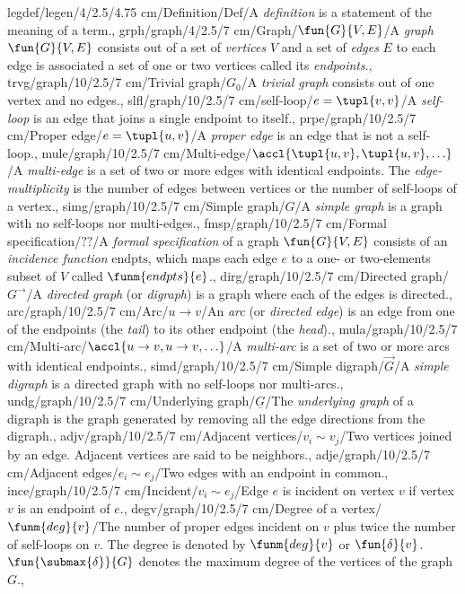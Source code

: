 legdef/legen/4/2.5/4.75 cm/Definition/Def/{A \emph{definition} is a statement of the meaning of a term.},
grph/graph/4/2.5/7 cm/Graph/{$\fun{G}{V,E}$}/{A \emph{graph} $\fun{G}{V,E}$ consists out of a set of \emph{vertices} $V$ and a set of \emph{edges} $E$ to each edge is associated a set of one or two vertices called its \emph{endpoints}.},
trvg/graph/10/2.5/7 cm/{Trivial graph}/$G_0$/{A \emph{trivial graph} consists out of one vertex and no edges.},
slfl/graph/10/2.5/7 cm/{self-loop}/$e=\tupl{v,v}$/{A \emph{self-loop} is an edge that joins a single endpoint to itself.},
prpe/graph/10/2.5/7 cm/{Proper edge}/$e=\tupl{u,v}$/{A \emph{proper edge} is an edge that is not a self-loop.},
mule/graph/10/2.5/7 cm/{Multi-edge}/$\accl{\tupl{u,v},\tupl{u,v},\ldots}$/{A \emph{multi-edge} is a set of two or more edges with identical endpoints. The \emph{edge-multiplicity} is the number of edges between vertices or the number of self-loops of a vertex.},
simg/graph/10/2.5/7 cm/{Simple graph}/$G$/{A \emph{simple graph} is a graph with no self-loops nor multi-edges.},
fmsp/graph/10/2.5/7 cm/{Formal specification}/$??$/{A \emph{formal specification} of a graph $\fun{G}{V,E}$ consists of an \emph{incidence function} $\mbox{endpts}$, which maps each edge $e$ to a one- or two-elements subset of $V$ called $\funm{endpts}{e}$.},
dirg/graph/10/2.5/7 cm/{Directed graph}/$G^{\rightarrow}$/{A \emph{directed graph} (or \emph{digraph}) is a graph where each of the edges is directed.},
arc/graph/10/2.5/7 cm/{Arc}/$u\rightarrow v$/{An \emph{arc} (or \emph{directed edge}) is an edge from one of the endpoints (the \emph{tail}) to its other endpoint (the \emph{head}).},
mula/graph/10/2.5/7 cm/{Multi-arc}/$\accl{u\rightarrow v,u\rightarrow v,\ldots}$/{A \emph{multi-arc} is a set of two or more arcs with identical endpoints.},
simd/graph/10/2.5/7 cm/{Simple digraph}/$\vec{G}$/{A \emph{simple digraph} is a directed graph with no self-loops nor multi-arcs.},
undg/graph/10/2.5/7 cm/{Underlying graph}/$\underline{G}$/{The \emph{underlying graph} of a digraph is the graph generated by removing all the edge directions from the digraph.},
adjv/graph/10/2.5/7 cm/{Adjacent vertices}/{$v_i\sim v_j$}/{Two vertices joined by an edge. Adjacent vertices are said to be neighbors.},
adje/graph/10/2.5/7 cm/{Adjacent edges}/{$e_i\sim e_j$}/{Two edges with an endpoint in common.},
ince/graph/10/2.5/7 cm/{Incident}/{$v_i\sim e_j$}/{Edge $e$ is incident on vertex $v$ if vertex $v$ is an endpoint of $e$.},
degv/graph/10/2.5/7 cm/{Degree of a vertex}/{$\funm{deg}{v}$}/{The number of proper edges incident on $v$ plus twice the number of self-loops on $v$. The degree is denoted by $\funm{deg}{v}$ or $\fun{\delta}{v}$. $\fun{\submax{\delta}}{G}$ denotes the maximum degree of the vertices of the graph $G$.},
